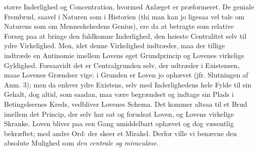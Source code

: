 \documentclass[12pt]{book}
\newcommand{\divrule}{\begin{center}%
  \rule{0.27\linewidth}{0.9pt}\\[1.6pt]\rule{0.22\linewidth}{0.4pt}\end{center}}
\newcommand{\secrule}{\begin{center}%
  \rule{0.20\linewidth}{0.4pt}\\[1.3pt]\rule{0.20\linewidth}{0.4pt}\end{center}}
\begin{document}
større Inderlighed og Concentration, hvormed Anlæget er præformeret. De geniale Frembrud,
saavel i Naturen som i Historien (thi man kan jo ligesaa vel tale om Naturens som om
Menneskehedens Genius), ere da at betragte som relative Forsøg paa at bringe den fuldkomne
Inderlighed, den høieste Centralitet selv til ydre Virkelighed. Men, idet denne Virkelighed
indtræder, maa der tillige indtræde en Antinomie imellem Lovens eget Grundprincip og Lovenes
virkelige Gyldighed. Forsaavidt det er Centralgrunden selv, der udtræder i Existensen, maae
Lovenes Grændser vige: i Grunden er Loven jo ophævet (jfr. Slutningen af Anm. 3); men da
enhver ydre Existens, selv med Inderlighedens hele Fylde til sin Gehalt, dog altid, som
saadan, maa være begrændset og indtage sin Plads i Betingelsernes Kreds, vedbliver Lovenes
Schema. Det kommer altsaa til et Brud imellem det Princip, der selv har sat og forudsat
Loven, og Lovens virkelige Skranke. Loven bliver paa een Gang umiddelbart ophævet og dog
væsentlig bekræftet; med andre Ord: der skeer et Mirakel. Derfor ville vi benævne den
absolute Mulighed som \emph{den centrale og miraculøse}.
\end{document}
